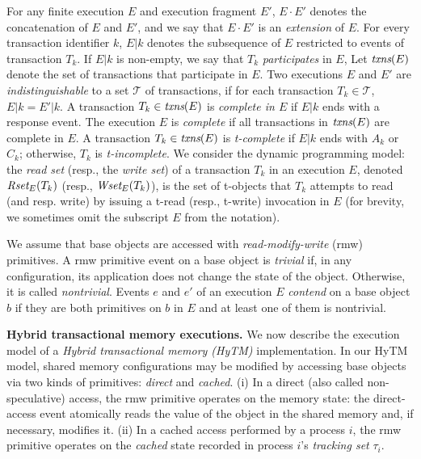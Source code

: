 For any finite execution $E$ and execution fragment $E'$, $E\cdot E'$ denotes the concatenation of $E$ and $E'$,
and we say that $E\cdot E'$ is an \emph{extension}
of $E$.
For every transaction identifier $k$,
$E|k$ denotes the subsequence of $E$ restricted to events of
transaction $T_k$.
If $E|k$ is non-empty,
we say that $T_k$ \emph{participates} in $E$,
Let $\textit{txns}(E)$ denote the set of transactions that participate in $E$.
Two executions $E$ and $E'$
are \emph{indistinguishable} to a set $\mathcal{T}$ of transactions, if
for each transaction $T_k \in \mathcal{T}$, $E|k=E'|k$.
A transaction $T_k\in \textit{txns}(E)$ is \emph{complete in $E$} if
$E|k$ ends with a response event.
The execution $E$ is \emph{complete} if all transactions in $\textit{txns}(E)$
are complete in $E$.
A transaction $T_k\in \textit{txns}(E)$ is \emph{t-complete} if $E|k$
ends with $A_k$ or $C_k$; otherwise, $T_k$ is \emph{t-incomplete}.
We consider the dynamic programming model: the \emph{read set} (resp., the \emph{write set}) of a transaction $T_k$ in an execution $E$,
denoted $\textit{Rset}_E(T_k)$ (resp., $\textit{Wset}_E(T_k)$), is the set of t-objects that $T_k$ attempts to read (and resp. write) 
by issuing a t-read (resp., t-write) invocation in $E$ (for brevity, we sometimes 
omit the subscript $E$ from the notation).

We assume that base objects are accessed with \emph{read-modify-write} (rmw) primitives. 
A rmw primitive event on a base object is \emph{trivial} if, in any configuration, its application
does not change the state of the object. 
Otherwise, it is called \emph{nontrivial}.
Events $e$ and $e'$ of an execution $E$  \emph{contend} on a base
object $b$ if they are both primitives on $b$ in $E$ and at least 
one of them is nontrivial.

\vspace{1mm}\noindent\textbf{Hybrid transactional memory executions.}
We now describe the execution model of a \emph{Hybrid transactional memory (HyTM)} implementation.
In our HyTM model, shared memory configurations may be modified by accessing base objects via two kinds of
primitives: \emph{direct} and \emph{cached}.
(i) In a direct (also called non-speculative) access, the rmw primitive operates on the memory state:
the direct-access event atomically reads the value of the object in
the shared memory and, if necessary, modifies it.
(ii) In a cached access performed by a process $i$, the rmw primitive operates on the \emph{cached}
state recorded in process $i$'s \emph{tracking set} $\tau_i$.


